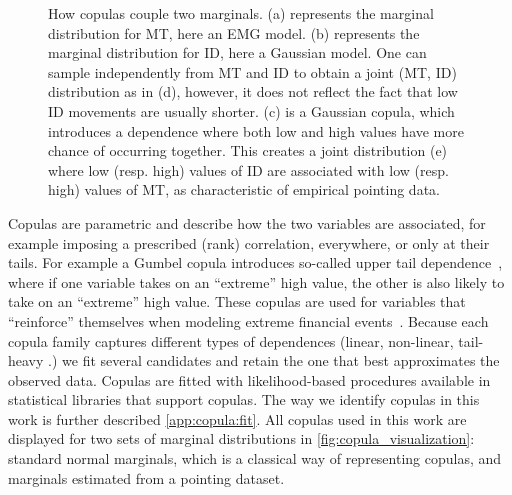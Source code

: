 \documentclass[acmlarge, manuscript,review]{acmart}
\begin{document}
\begin{figure}[htbp]
	\centering
	\caption{How copulas couple two marginals. (a) represents the marginal distribution for MT, here an EMG model. (b) represents the marginal distribution for ID, here a Gaussian model. One can sample independently from MT and ID to obtain a joint (MT, ID) distribution as in (d), however, it does not reflect the fact that low ID movements are usually shorter. (c) is a Gaussian copula, which introduces a dependence where both low and high values have more chance of occurring together. This creates a joint distribution (e) where low (resp. high) values of ID are associated with low (resp. high) values of MT, as characteristic of empirical pointing data.}
	\label{fig:copulas_explained}
\end{figure}



Copulas are parametric and describe how the two variables are associated, for example imposing a prescribed (rank) correlation, everywhere, or only at their tails.
For example a Gumbel copula introduces so-called upper tail dependence~\cite{nelsen2006}, where if one variable takes on an ``extreme'' high value, the other is also likely to take on an ``extreme'' high value. These copulas are used for variables that ``reinforce'' themselves \eg when modeling extreme financial events~\cite{dewick2022}.
Because each copula family captures different types of dependences (linear, non-linear, tail-heavy \etc.) we fit several candidates and retain the one that best approximates the observed data. Copulas are fitted with likelihood-based procedures available in statistical libraries that support copulas.
The way we identify copulas in this work is further described \autoref{app:copula:fit}. All copulas used in this work are displayed for two sets of marginal distributions in \autoref{fig:copula_visualization}: standard normal marginals, which is a classical way of representing copulas, and marginals estimated from a pointing dataset. 
\end{document}
